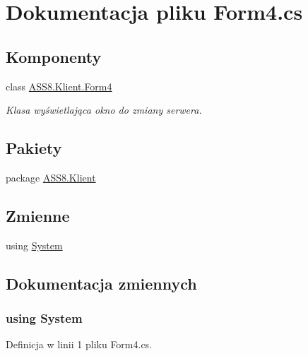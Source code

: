 \hypertarget{a00047}{
\section{Dokumentacja pliku Form4.cs}
\label{d6/d2d/a00047}
}
\subsection*{Komponenty}
\begin{CompactItemize}
\item 
class \hyperlink{a00005}{ASS8.Klient.Form4}
\begin{CompactList}\small\item\em Klasa wyświetlająca okno do zmiany serwera. \item\end{CompactList}\end{CompactItemize}
\subsection*{Pakiety}
\begin{CompactItemize}
\item 
package \hyperlink{a00060}{ASS8.Klient}
\end{CompactItemize}
\subsection*{Zmienne}
\begin{CompactItemize}
\item 
﻿using \hyperlink{a00047_81a223a02c34d82b47199f08308847f2}{System}
\end{CompactItemize}


\subsection{Dokumentacja zmiennych}
\hypertarget{a00047_81a223a02c34d82b47199f08308847f2}{
\subsubsection[{System}]{\setlength{\rightskip}{0pt plus 5cm}﻿using {\bf System}}}
\label{d6/d2d/a00047_81a223a02c34d82b47199f08308847f2}




Definicja w linii 1 pliku Form4.cs.